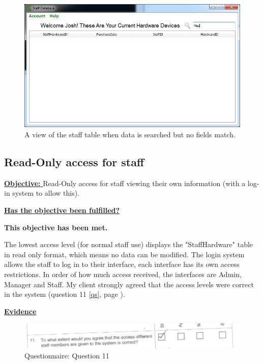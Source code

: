 \begin{figure}[H]
    \includegraphics[width=\textwidth]{./Evaluation/Images/staffsearch2.png}
    \caption{A view of the staff table when data is searched but no fields match.} 
\end{figure}

\subsection{Read-Only access for staff}

\underline{\textbf{Objective:} }  Read-Only access for staff viewing their own information (with a log-in system to allow this).

\underline{\textbf{Has the objective been fulfilled?}}

\textbf{This objective has been met.}

The lowest access level (for normal staff use) displays the "StaffHardware" table in read only format, which means no data can be modified. The login system allows the staff to log in to their interface, each interface has its own access restrictions. In order of how much access received, the interfaces are Admin, Manager and Staff. My client strongly agreed that the access levels were correct in the system (question 11 \ref{qs}, page \pageref{qs}).

\underline{\textbf{Evidence}}

\begin{figure}[H]
    \includegraphics[width=\textwidth]{./Evaluation/EvaluationQuestionnaire/11.png}
    \caption{Questionnaire: Question 11} 
\end{figure}


